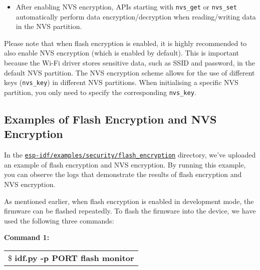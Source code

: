 \documentclass[a4paper,12pt]{book}
\begin{document}
\begin{itemize}[leftmargin=1em]
    \begin{codebloc}
    \begin{tabular}{a}
    \$ \textbf{parttool.py -p (PORT) --partition-table-offset "nvs\_key partition offset" write\_partition --partition-name="name of nvs\_key partition" --input "nvs\_key partition"}
    \end{tabular}
    \end{codebloc}

    \item After enabling NVS encryption, APIs starting with \verb|nvs_get| or \verb|nvs_set| automatically perform data encryption/decryption when reading/writing data in the NVS partition.
\end{itemize}

Please note that when flash encryption is enabled, it is highly recommended to also enable NVS encryption (which is enabled by default). This is important because the Wi-Fi driver stores sensitive data, such as SSID and password, in the default NVS partition. The NVS encryption scheme allows for the use of different keys (\verb|nvs_key|) in different NVS partitions. When initialising a specific NVS partition, you only need to specify the corresponding \verb|nvs_key|. 


\subsection{Examples of Flash Encryption and NVS Encryption}
In the \href{https://github.com/espressif/esp-idf/tree/master/examples/security/flash_encryption}{\texttt{esp-idf/examples/security/flash\_encryption}} directory, we’ve uploaded an example of flash encryption and NVS encryption. By running this example, you can observe the logs that demonstrate the results of flash encryption and NVS encryption.

As mentioned earlier, when flash encryption is enabled in development mode, the firmware can be flashed repeatedly. To flash the firmware into the device, we have used the following three commands:

\textbf{Command 1:}

\begin{codebloc}
\begin{tabular}{d}
\$ \textbf{idf.py -p PORT flash monitor}
\end{tabular}
\end{codebloc}
\end{document}
